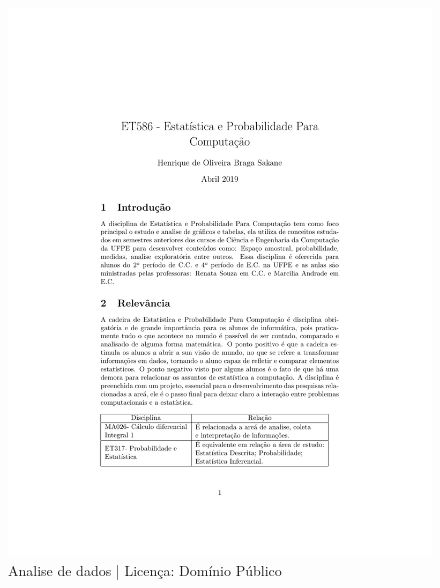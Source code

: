 \documentclass{article}
\begin{document}
\begin{figure}[hbt!]
\centering
\includegraphics[scale=0.3]{hobs}
\caption{Analise de dados | Licença: Domínio Público}
\label{fig:hobs}
\end{figure}




\cite{SiteDaDisciplinaCC}
\cite{SiteDaDisciplinaEC}
\cite{ManualDeSobrevivenciaPet}
\cite{Fonteimagem}
\end{document}
